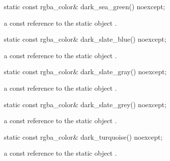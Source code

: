 \begin{itemdecl}
    static const rgba_color& dark_sea_green() noexcept;
\end{itemdecl}
\begin{itemdescr}
    \pnum
    \returns
    a const reference to the static  object .
\end{itemdescr}

\begin{itemdecl}
    static const rgba_color& dark_slate_blue() noexcept;
\end{itemdecl}
\begin{itemdescr}
    \pnum
    \returns
    a const reference to the static  object .
\end{itemdescr}

\begin{itemdecl}
    static const rgba_color& dark_slate_gray() noexcept;
\end{itemdecl}
\begin{itemdescr}
    \pnum
    \returns
    a const reference to the static  object .
\end{itemdescr}

\begin{itemdecl}
    static const rgba_color& dark_slate_grey() noexcept;
\end{itemdecl}
\begin{itemdescr}
    \pnum
    \returns
    a const reference to the static  object .
\end{itemdescr}

\begin{itemdecl}
    static const rgba_color& dark_turquoise() noexcept;
\end{itemdecl}
\begin{itemdescr}
    \pnum
    \returns
    a const reference to the static  object .
\end{itemdescr}

